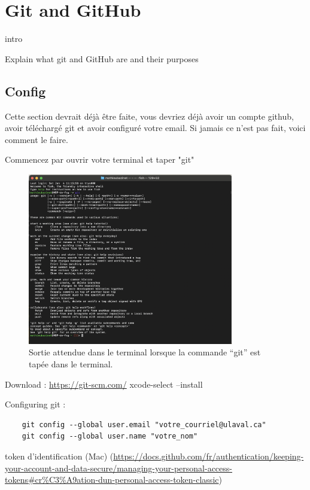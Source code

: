 \documentclass{book}
\begin{document}
\setlength{\parindent}{0cm}
\chapter{Git and GitHub}

intro

Explain what git and GitHub are and their purposes

\section{Config}

Cette section devrait déjà être faite, vous devriez déjà avoir un compte github, avoir téléchargé git et avoir configuré votre email. Si jamais ce n'est pas fait, voici comment le faire. 

Commencez par ouvrir votre terminal et taper "git" 

\begin{figure}[!h]
    \centering
    \includegraphics[width=0.8\textwidth]{images/check_if_git.png}
    \caption{Sortie attendue dans le terminal lorsque la commande ``git'' est tapée dans le terminal.} \label{fig:check_if_git}
\end{figure}
Download : 
	\url{https://git-scm.com/}
	xcode-select --install

Configuring git :
\begin{lstlisting}
	git config --global user.email "votre_courriel@ulaval.ca"
	git config --global user.name "votre_nom"
\end{lstlisting}
token d’identification (Mac) (\url{https://docs.github.com/fr/authentication/keeping-your-account-and-data-secure/managing-your-personal-access-tokens\#cr%C3%A9ation-dun-personal-access-token-classic}) 
\end{document}
